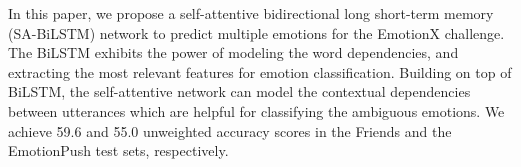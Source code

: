 In this paper, we propose a self-attentive bidirectional long short-term memory (SA-BiLSTM) network to predict multiple emotions for the EmotionX challenge. The BiLSTM exhibits the power of modeling the word dependencies, and extracting the most relevant features for emotion classification.  Building on top of BiLSTM, the self-attentive network can model the contextual dependencies between utterances which are helpful for classifying the ambiguous emotions.  We achieve 59.6 and 55.0 unweighted accuracy scores in the Friends and the EmotionPush test sets, respectively.

